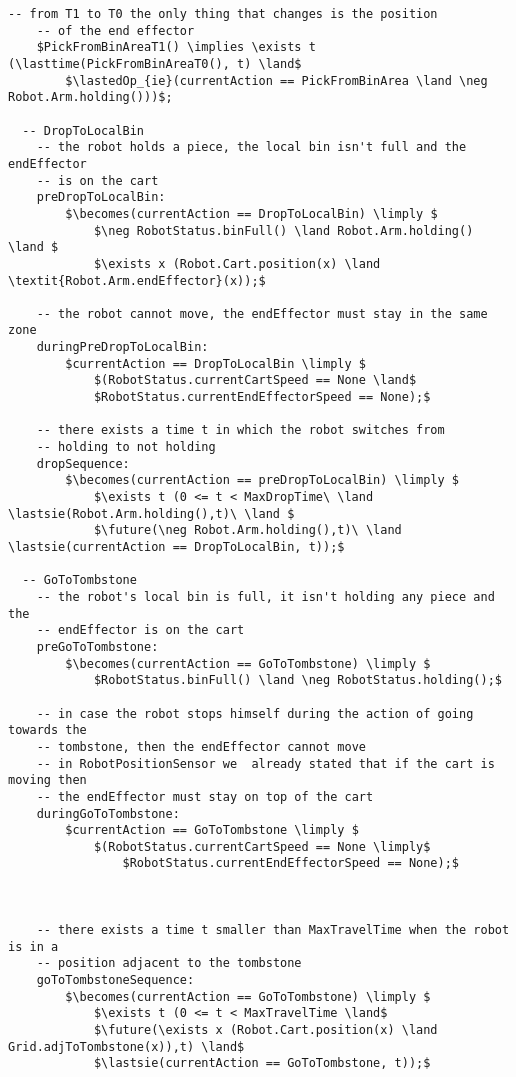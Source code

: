 \begin{lstlisting}[fontadjust, mathescape, frame=single]
    -- from T1 to T0 the only thing that changes is the position
    -- of the end effector
    $PickFromBinAreaT1() \implies \exists t (\lasttime(PickFromBinAreaT0(), t) \land$
        $\lastedOp_{ie}(currentAction == PickFromBinArea \land \neg Robot.Arm.holding()))$;
      
  -- DropToLocalBin
    -- the robot holds a piece, the local bin isn't full and the endEffector 
    -- is on the cart
    preDropToLocalBin:
        $\becomes(currentAction == DropToLocalBin) \limply $
            $\neg RobotStatus.binFull() \land Robot.Arm.holding() \land $
            $\exists x (Robot.Cart.position(x) \land \textit{Robot.Arm.endEffector}(x));$
    
    -- the robot cannot move, the endEffector must stay in the same zone
    duringPreDropToLocalBin:
        $currentAction == DropToLocalBin \limply $
            $(RobotStatus.currentCartSpeed == None \land$
            $RobotStatus.currentEndEffectorSpeed == None);$
  
    -- there exists a time t in which the robot switches from 
    -- holding to not holding
    dropSequence:
        $\becomes(currentAction == preDropToLocalBin) \limply $
            $\exists t (0 <= t < MaxDropTime\ \land \lastsie(Robot.Arm.holding(),t)\ \land $
            $\future(\neg Robot.Arm.holding(),t)\ \land \lastsie(currentAction == DropToLocalBin, t));$
  
  -- GoToTombstone
    -- the robot's local bin is full, it isn't holding any piece and the 
    -- endEffector is on the cart
    preGoToTombstone:
        $\becomes(currentAction == GoToTombstone) \limply $
            $RobotStatus.binFull() \land \neg RobotStatus.holding();$
    
    -- in case the robot stops himself during the action of going towards the 
    -- tombstone, then the endEffector cannot move 
    -- in RobotPositionSensor we  already stated that if the cart is moving then 
    -- the endEffector must stay on top of the cart
    duringGoToTombstone:
        $currentAction == GoToTombstone \limply $
            $(RobotStatus.currentCartSpeed == None \limply$ 
                $RobotStatus.currentEndEffectorSpeed == None);$



    -- there exists a time t smaller than MaxTravelTime when the robot is in a 
    -- position adjacent to the tombstone
    goToTombstoneSequence:
        $\becomes(currentAction == GoToTombstone) \limply $
            $\exists t (0 <= t < MaxTravelTime \land$
            $\future(\exists x (Robot.Cart.position(x) \land Grid.adjToTombstone(x)),t) \land$
            $\lastsie(currentAction == GoToTombstone, t));$


\end{lstlisting}
